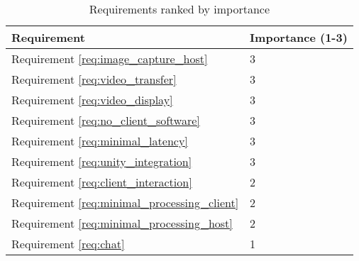 \begin{table}[]
    \begin{tabular}{ | p{5cm} | p{6.25cm} | }
        \hline
        Requirement & Importance (1-3) \\
        \hline
        Requirement \ref{req:image_capture_host}            & 3                 \\
        Requirement \ref{req:video_transfer}                & 3                 \\
        Requirement \ref{req:video_display}                 & 3                 \\
        Requirement \ref{req:no_client_software}            & 3                 \\
        Requirement \ref{req:minimal_latency}               & 3                 \\
        Requirement \ref{req:unity_integration}             & 3                 \\
        Requirement \ref{req:client_interaction}            & 2                 \\
        Requirement \ref{req:minimal_processing_client}     & 2                 \\
        Requirement \ref{req:minimal_processing_host}       & 2                 \\
        Requirement \ref{req:chat}                          & 1                 \\
        \hline
    \end{tabular}
    \caption{Requirements ranked by importance}
    \label{tab:requirements_ranking}
\end{table}

